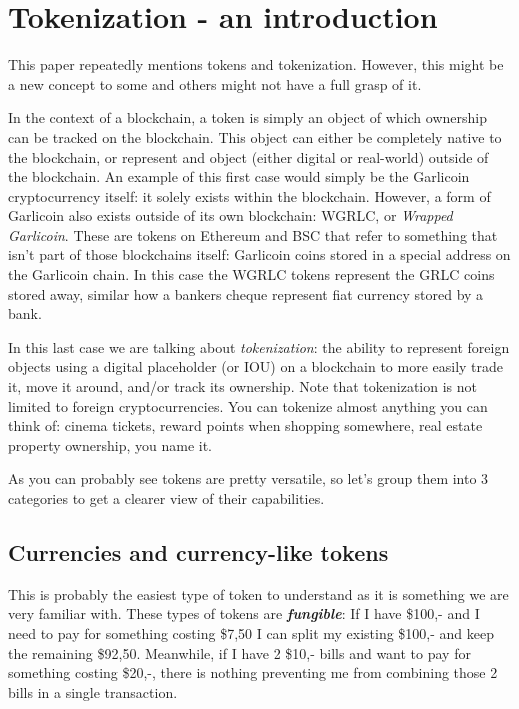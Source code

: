 \documentclass{article}
\begin{document}
\newpage
\section{Tokenization - an introduction}
This paper repeatedly mentions tokens and tokenization. However, this might be a new concept to some and others might not have a full grasp of it.

In the context of a blockchain, a token is simply an object of which ownership can be tracked on the blockchain. This object can either be completely native to the blockchain, or represent and object (either digital or real-world) outside of the blockchain. An example of this first case would simply be the Garlicoin cryptocurrency itself: it solely exists within the blockchain. However, a form of Garlicoin also exists outside of its own blockchain: WGRLC, or \emph{Wrapped Garlicoin}. These are tokens on Ethereum and BSC that refer to something that isn't part of those blockchains itself: Garlicoin coins stored in a special address on the Garlicoin chain. In this case the WGRLC tokens represent the GRLC coins stored away, similar how a bankers cheque represent fiat currency stored by a bank.

In this last case we are talking about \emph{tokenization}: the ability to represent foreign objects using a digital placeholder (or IOU) on a blockchain to more easily trade it, move it around, and/or track its ownership. Note that tokenization is not limited to foreign cryptocurrencies. You can tokenize almost anything you can think of: cinema tickets, reward points when shopping somewhere, real estate property ownership, you name it.

As you can probably see tokens are pretty versatile, so let's group them into 3 categories to get a clearer view of their capabilities.

\subsection{Currencies and currency-like tokens}

This is probably the easiest type of token to understand as it is something we are very familiar with. These types of tokens are \emph{\textbf{fungible}}: If I have \$100,- and I need to pay for something costing \$7,50 I can split my existing \$100,- and keep the remaining \$92,50. Meanwhile, if I have 2 \$10,- bills and want to pay for something costing \$20,-, there is nothing preventing me from combining those 2 bills in a single transaction.
\end{document}
